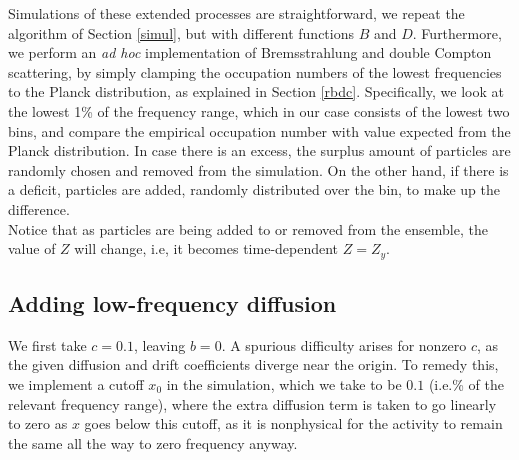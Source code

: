 \documentclass[a4paper,12pt,reqno,superscriptaddress,nofootinbib]{revtex4}
\newcommand{\0}{^{(0)}}
\newcommand{\1}{^{(1)}}
\newcommand{\2}{^{(2)}}
\begin{document}
Simulations of these extended processes are straightforward, we repeat the 
algorithm of Section \ref{simul}, but with different functions $B$ and $D$.  Furthermore, we perform an {\it ad hoc} implementation of Bremsstrahlung and double Compton scattering, by 
simply clamping the occupation numbers of the lowest frequencies to the Planck 
distribution, as explained in Section \ref{rbdc}. Specifically, we look at the 
lowest 1\% of the frequency range, which in our case consists of the lowest two 
bins, and compare the empirical occupation number with value expected from the 
Planck distribution. In case there is an excess, the surplus amount of particles 
are randomly chosen and removed from the simulation. On the other hand, if 
there is a deficit, particles are added, randomly distributed over the bin, to 
make up the difference.\\ 
Notice that as particles are being added to or removed from the ensemble, the 
value of $Z$ will change, i.e, it becomes time-dependent $Z=Z_y$.

\subsection{Adding low-frequency diffusion}

We first take $c = 0.1$, leaving $b=0$. A spurious difficulty arises for 
nonzero $c$, as the given diffusion and drift coefficients diverge near the 
origin. To remedy this, we implement a cutoff $x_0$ in the simulation, which we 
take to be $0.1$ (i.e.\% of the relevant frequency range), where the extra 
diffusion term is taken to go linearly to zero as $x$ goes below this cutoff, 
as it is nonphysical for the activity to remain the same all the way to zero 
frequency anyway.
\end{document}
